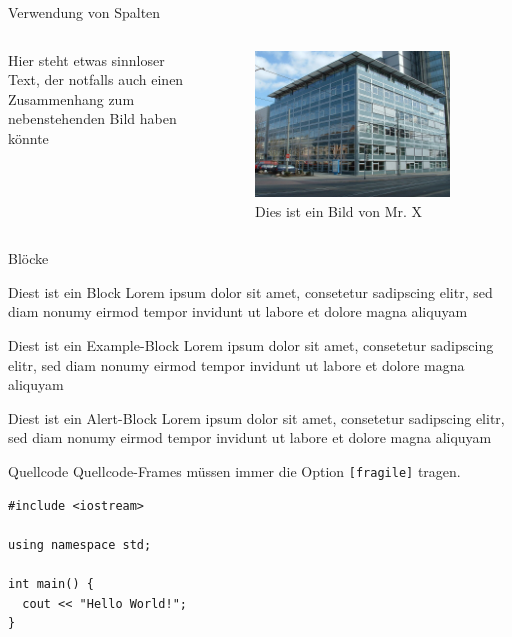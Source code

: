 \documentclass[fleqn,11pt,aspectratio=169]{beamer}
\begin{document}
\begin{frame}{Verwendung von Spalten}
  \begin{columns}[onlytextwidth]
      Hier steht etwas sinnloser Text, der notfalls auch einen
      Zusammenhang zum nebenstehenden Bild haben könnte
      \centering
      \begin{figure}
        \includegraphics[width=0.9\textwidth]{infozentrum.jpg}
        \caption{Dies ist ein Bild von Mr. X}
      \end{figure}
  \end{columns}
\end{frame}

\begin{frame}{Blöcke}
  \begin{block}{Diest ist ein Block}
    Lorem ipsum dolor sit amet, consetetur sadipscing elitr, sed diam
    nonumy eirmod tempor invidunt ut labore et dolore magna aliquyam
  \end{block}
  \begin{exampleblock}{Diest ist ein Example-Block}
    Lorem ipsum dolor sit amet, consetetur sadipscing elitr, sed diam
    nonumy eirmod tempor invidunt ut labore et dolore magna aliquyam
  \end{exampleblock}
  \begin{alertblock}{Diest ist ein Alert-Block}
    Lorem ipsum dolor sit amet, consetetur sadipscing elitr, sed diam
    nonumy eirmod tempor invidunt ut labore et dolore magna aliquyam
  \end{alertblock}
\end{frame}


\begin{frame}[fragile]{Quellcode}
Quellcode-Frames müssen immer die Option \texttt{[fragile]} tragen.
  \begin{verbatim}
#include <iostream>

using namespace std;

int main() {
  cout << "Hello World!";
}
  \end{verbatim}
\end{frame}
\end{document}
